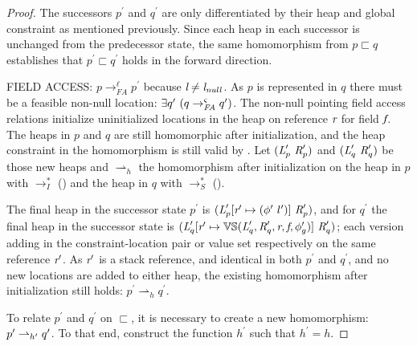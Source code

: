 \begin{proof}
The successors $p^\prime$ and $q^\prime$ are only differentiated by
their heap and global constraint as mentioned previously. Since each heap in each successor is unchanged
from the predecessor state, the same homomorphism from $p \sqsubset q$
establishes that $p^\prime \sqsubset q^\prime$ holds in the forward direction.

\noindent\textrm{F{\footnotesize IELD}}
\textrm{A{\footnotesize CCESS}}: $p \rightarrow^\ell_\mathit{FA}
p^\prime $ because $\emph{l} \neq \emph{l}_\mathit{null}$. As $p$ is represented in $q$ there must be a feasible non-null location: $\exists q^\prime\ (q
\rightarrow^{\varsigma}_\mathit{FA} q^\prime)$. The non-null pointing field access relations initialize
uninitialized locations in the heap on reference $\emph{r}$ for field
$\emph{f}$. The heaps in $p$ and $q$ are still homomorphic after
initialization, and the heap constraint in the homomorphism is still
valid by . Let $(\emph{L}^\prime_p\ \emph{R}^\prime_p)$ and  
$(\cfgnt{L}^\prime_q\ \cfgnt{R}^\prime_q)$ be those new heaps and $\rightharpoonup_h$
the homomorphism after initialization on the heap in $p$ with
$\rightarrow_I^*$ () and the heap in $q$ with
$\rightarrow_S^*$ ().

The final heap in the successor state $p^\prime$ is
$(\emph{L}^\prime_p [\emph{r}^\prime \mapsto
  (\phi^\prime\ l^\prime)]\ \emph{R}^\prime_p)$, and for $q^\prime$
the final heap in the successor state is
$(\emph{L}^\prime_q[\emph{r}^\prime \mapsto \mathbb{VS}(
  \emph{L}^\prime_q,\emph{R}^\prime_q,\emph{r},\emph{f},\phi^\prime_g)
]\ \emph{R}^\prime_q)$; each version adding in the
constraint-location pair or value set respectively on the same
reference $\emph{r}^\prime$. As $\emph{r}^\prime$ is a stack reference, and
identical in both $p^\prime$ and $q^\prime$, and no new locations are
added to either heap, the existing homomorphism after initialization
still holds: $p^\prime \rightharpoonup_h q^\prime$.


 To relate $p^\prime$ and $q^\prime$ on
$\sqsubset$, it is necessary to create a new homomorphism:
$p^\prime \rightharpoonup_{h^\prime}
q^\prime$. To that end, construct the
function $h^\prime$ such that $h^\prime = h$.



\end{proof}
